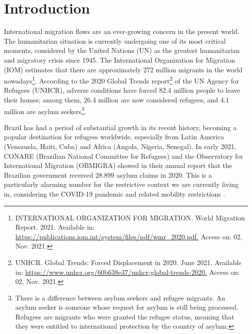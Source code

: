 \documentclass[english]{textolivre}
\begin{document}
\begin{polyabstract}
\begin{portuguese}
\begin{abstract}
\end{abstract}
\end{portuguese}

\end{polyabstract}

\section{Introduction}\label{sec-intro}

International migration flows are an ever-growing concern in the present world. The humanitarian situation is currently undergoing one of its most critical moments, considered by the United Nations (UN) as the greatest humanitarian and migratory crisis since 1945. The International Organization for Migration (IOM) estimates that there are approximately 272 million migrants in the world nowadays\footnote{INTERNATIONAL ORGANIZATION FOR MIGRATION. World Migration Report. 2021. Available in: \url{https://publications.iom.int/system/files/pdf/wmr_2020.pdf.} Access on: 02, Nov. 2021.}. According to the 2020 Global Trends report\footnote{UNHCR. Global Trends: Forced Displacement in 2020. June 2021. Available in: \url{https://www.unhcr.org/60b638e37/unhcr-global-trends-2020.} Access on: 02, Nov. 2021.} of the UN Agency for Refugees (UNHCR), adverse conditions have forced 82.4 million people to leave their homes; among them, 26.4 million are now considered refugees, and 4.1 million are asylum seekers\footnote{There is a difference between asylum seekers and refugee migrants. An asylum seeker is someone whose request for asylum is still being processed. Refugees are migrants who were granted the refugee status, meaning that they were entitled to international protection by the country of asylum.}.

Brazil has had a period of substantial growth in its recent history, becoming a popular destination for refugees worldwide, especially from Latin America (Venezuela, Haiti, Cuba) and Africa (Angola, Nigeria, Senegal). In early 2021, CONARE (Brazilian National Committee for Refugees) and the Observatory for International Migration (OBMIGRA) showed in their annual report that the Brazilian government received 28.899 asylum claims in 2020. This is a particularly alarming number for the restrictive context we are currently living in, considering the COVID-19 pandemic and related mobility restrictions \cite[p.~9]{silva_refugio_2021}.
\end{document}
